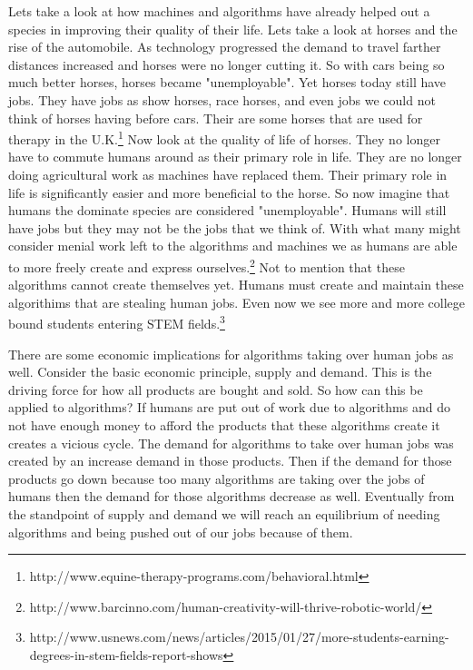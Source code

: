 \documentclass[a4paper,11pt, twocolumn]{article}
\begin{document}
Lets take a look at how machines and algorithms have already helped out a species in improving their quality of their life. Lets take a look at horses and the rise of the automobile. As technology progressed the demand to travel farther distances increased and horses were no longer cutting it. So with cars being so much better horses, horses became "unemployable". Yet horses today still have jobs. They have jobs as show horses, race horses, and even jobs we could not think of horses having before cars. Their are some horses that are used for therapy in the U.K.\footnote{http://www.equine-therapy-programs.com/behavioral.html} Now look at the quality of life of horses. They no longer have to commute humans around as their primary role in life. They are no longer doing agricultural work as machines have replaced them. Their primary role in life is significantly easier and more beneficial to the horse. So now imagine that humans the dominate species are considered "unemployable". Humans will still have jobs but they may not be the jobs that we think of. With what many might consider menial work left to the algorithms and machines we as humans are able to more freely create and express ourselves.\footnote{http://www.barcinno.com/human-creativity-will-thrive-robotic-world/} Not to mention that these algorithms cannot create themselves yet. Humans must create and maintain these algorithims that are stealing human jobs. Even now we see more and more college bound students entering STEM fields.\footnote{http://www.usnews.com/news/articles/2015/01/27/more-students-earning-degrees-in-stem-fields-report-shows}  
 
There are some economic implications for algorithms taking over human jobs as well. Consider the basic economic principle, supply and demand. This is the driving force for how all products are bought and sold. So how can this be applied to algorithms? If humans are put out of work due to algorithms and do not have enough money to afford the products that these algorithms create it creates a vicious cycle. The demand for algorithms to take over human jobs was created by an increase demand in those products. Then if the demand for those products go down because too many algorithms are taking over the jobs of humans then the demand for those algorithms decrease as well. Eventually from the standpoint of supply and demand we will reach an equilibrium of needing algorithms and being pushed out of our jobs because of them. 
 
\end{document}
